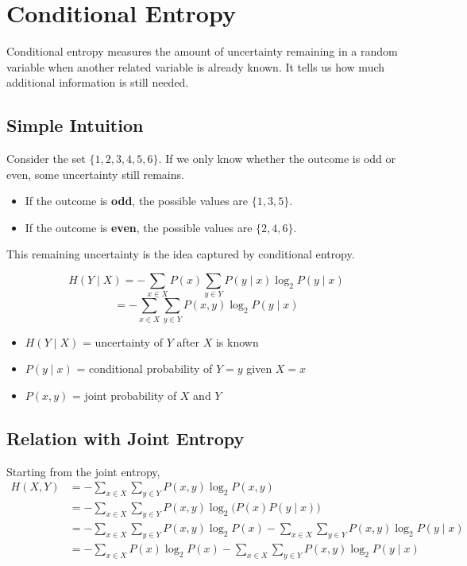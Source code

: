 \documentclass[11pt,a4paper]{book}
\newenvironment{definitionbox}[1][Definition]{%
    \begin{tcolorbox}[
        enhanced,
        breakable,
        colback=primaryblue!10,
        colframe=primaryblue!150,
        title=#1,
        fonttitle=\bfseries,
        sharp corners,
        boxrule=0.8pt,
        left=8pt,
        right=8pt,
        top=6pt,
        bottom=6pt
    ]
}{\end{tcolorbox}}
\newenvironment{formulabox}[1][Formula]{%
    \begin{tcolorbox}[
        enhanced,
        breakable,
        colback=softcoral!10,
        colframe=softcoral!200,
        title=#1,
        fonttitle=\bfseries,
        coltitle=white,
        sharp corners,
        boxrule=1pt,
        left=8pt,
        right=8pt,
        top=6pt,
        bottom=6pt
    ]
}{\end{tcolorbox}}
\begin{document}
\clearpage

\section{Conditional Entropy}

\begin{definitionbox}[Conditional Entropy]
Conditional entropy measures the amount of uncertainty remaining in a random variable when another related variable is already known. It tells us how much additional information is still needed.
\end{definitionbox}

\subsection{Simple Intuition}
Consider the set $\{1,2,3,4,5,6\}$. If we only know whether the outcome is odd or even, some uncertainty still remains.
\begin{itemize}
    \item If the outcome is \textbf{odd}, the possible values are $\{1,3,5\}$.
    \item If the outcome is \textbf{even}, the possible values are $\{2,4,6\}$.
\end{itemize}
This remaining uncertainty is the idea captured by conditional entropy.

\begin{formulabox}[Conditional Entropy Formula]
\[
H(Y \mid X) = -\sum_{x \in X} P(x)\sum_{y \in Y} P(y \mid x)\log_2 P(y \mid x)
\]
\[
= -\sum_{x \in X}\sum_{y \in Y} P(x,y)\log_2 P(y \mid x)
\]
\begin{itemize}
    \item $H(Y \mid X)$ = uncertainty of $Y$ after $X$ is known
    \item $P(y \mid x)$ = conditional probability of $Y=y$ given $X=x$
    \item $P(x,y)$ = joint probability of $X$ and $Y$
\end{itemize}
\end{formulabox}

\subsection{Relation with Joint Entropy}
Starting from the joint entropy,
\begin{align*}
H(X,Y) &= -\sum_{x \in X}\sum_{y \in Y} P(x,y)\log_2 P(x,y) \\
&= -\sum_{x \in X}\sum_{y \in Y} P(x,y)\log_2\bigl(P(x)P(y \mid x)\bigr) \\
&= -\sum_{x \in X}\sum_{y \in Y} P(x,y)\log_2 P(x)
- \sum_{x \in X}\sum_{y \in Y} P(x,y)\log_2 P(y \mid x) \\
&= -\sum_{x \in X} P(x)\log_2 P(x)
- \sum_{x \in X}\sum_{y \in Y} P(x,y)\log_2 P(y \mid x)
\end{align*}
\end{document}
